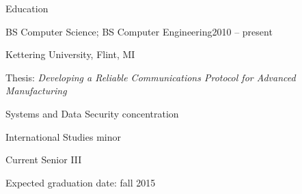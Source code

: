 \documentclass[letterpaper,12pt,oneside,compact]{article}
\begin{document}
\maketitle

\begin{heading}{Education}
\begin{resitem}{BS Computer Science; BS Computer Engineering\hfill 2010 -- present}
\item Kettering University, Flint, MI
\item Thesis: \emph{Developing a Reliable Communications Protocol for Advanced Manufacturing}
\item Systems and Data Security concentration
\item International Studies minor
\item Current Senior III
\item Expected graduation date: fall 2015
\end{resitem}
\end{heading}
\end{document}
